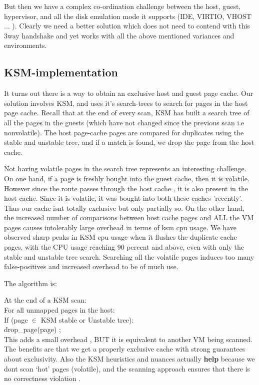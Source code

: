 \documentclass[10pt,a4paper]{article}
\begin{document}
But then we have a complex co-ordination challenge between the host, guest, hypervisor, and all the disk emulation mode it supports (IDE, VIRTIO, VHOST ... ). 
Clearly we need a better solution which does not need to contend with this 3way handshake and yet works with all the above mentioned variances and environments. 
    
\subsection{KSM-implementation}

It turns out there is a way to obtain an exclusive host and guest page cache. Our solution involves KSM, and uses it's search-trees to search for pages in the host page cache. Recall that at the end of every scan, KSM has built a search tree of all the pages in the guests (which have not changed since the previous scan i.e nonvolatile). The host page-cache pages are compared for duplicates using the stable and unstable tree, and if a match is found, we drop the page from the host cache. 

Not having volatile pages in the search tree represents an interesting challenge. On one hand, if a page is freshly bought into the guest cache, then it is volatile. However since the route passes through the host cache , it is also present in the host cache. Since it is volatile, it was bought into both these caches 'recently'. Thus our cache isnt totally exclusive but only partially so. 
On the other hand, the increased number of comparisons between host cache pages and ALL the VM pages causes intolerably large overhead in terms of ksm cpu usage. We have observed sharp peaks in KSM cpu usage when it flushes the duplicate cache pages, with the CPU usage reaching 90 percent and above, even with only the stable and unstable tree search. Searching all the volatile pages induces too many false-positives and increased overhead to be of much use.

The algorithm is:

At the end of a  KSM scan:  \\
   For all unmapped pages in the host:  \\
       If (page $\in$ KSM stable or Unstable tree):  \\
          drop\_page(page) ; \\
 

This adds a small overhead , BUT it is equivalent to another VM being scanned. The benefits are that we get a properly exclusive cache with strong guarantees 
about exclusivity. Also the KSM heuristics and nuances actually \textbf{help} because 
we dont scan `hot' pages (volatile), and the scanning approach ensures that 
there is no correctness violation .
\end{document}
